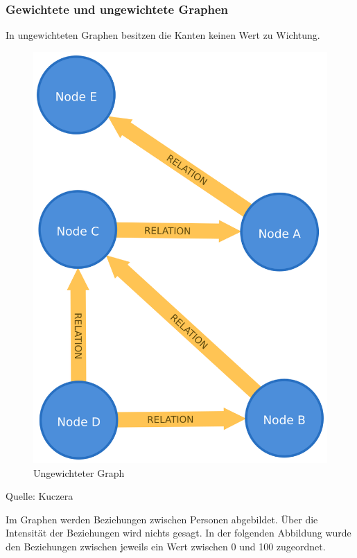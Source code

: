 \documentclass[12pt,ngerman,]{article}
\begin{document}
\subsubsection{Gewichtete und ungewichtete
Graphen}\label{gewichtete-und-ungewichtete-graphen}

In ungewichteten Graphen besitzen die Kanten keinen Wert zu Wichtung.

\begin{figure}
\centering
\includegraphics{Bilder/unWeightedGraph.png}
\caption{Ungewichteter Graph}
\end{figure}

Quelle: Kuczera

Im Graphen werden Beziehungen zwischen Personen abgebildet. Über die
Intensität der Beziehungen wird nichts gesagt. In der folgenden
Abbildung wurde den Beziehungen zwischen jeweils ein Wert zwischen 0 und
100 zugeordnet.
\end{document}
